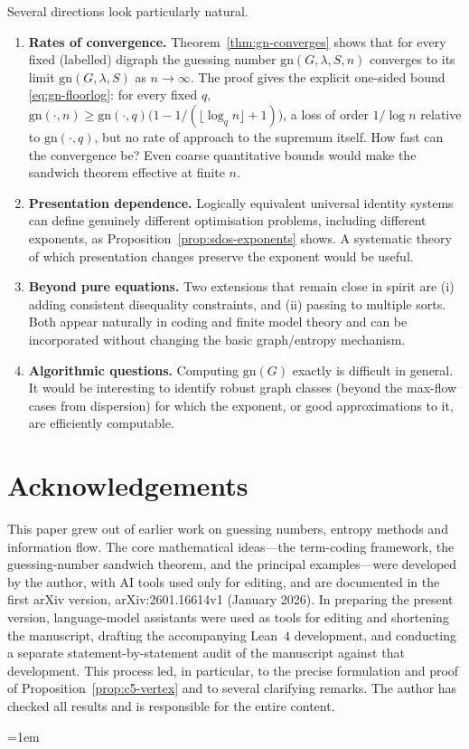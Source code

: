 \documentclass[11pt]{article}
\theoremstyle{plain}
\theoremstyle{definition}
\theoremstyle{definition}
\theoremstyle{remark}
\newcommand{\gn}{\mathrm{gn}}
\begin{document}
Several directions look particularly natural.
\begin{enumerate}[leftmargin=2.2em]
\item \textbf{Rates of convergence.}  Theorem~\ref{thm:gn-converges} shows that for every fixed (labelled) digraph the
  guessing number $\gn(G,\lambda,S,n)$ converges to its limit $\gn(G,\lambda,S)$ as $n\to\infty$.
  The proof gives the explicit one-sided bound \eqref{eq:gn-floorlog}: for every fixed $q$,
  $\gn(\cdot,n)\ge\gn(\cdot,q)\bigl(1-1/(\lfloor\log_q n\rfloor+1)\bigr)$, a loss of order
  $1/\log n$ relative to $\gn(\cdot,q)$, but no rate of approach to the supremum itself.  How
  fast can the convergence be?  Even coarse quantitative bounds would make the sandwich theorem effective at
  finite $n$.
\item \textbf{Presentation dependence.}  Logically equivalent universal identity systems can define genuinely
  different optimisation problems, including different exponents, as Proposition~\ref{prop:sdos-exponents} shows.
  A systematic theory of which presentation changes preserve the exponent would be useful.
\item \textbf{Beyond pure equations.}  Two extensions that remain close in spirit are (i) adding consistent
  disequality constraints, and (ii) passing to multiple sorts.  Both appear naturally in coding and finite
  model theory and can be incorporated without changing the basic graph/entropy mechanism.
\item \textbf{Algorithmic questions.}  Computing $\gn(G)$ exactly is difficult in general.  It would be
  interesting to identify robust graph classes (beyond the max-flow cases from dispersion) for which the
  exponent, or good approximations to it, are efficiently computable.
\end{enumerate}

\section*{Acknowledgements}
This paper grew out of earlier work on guessing numbers, entropy methods and information flow.
The core mathematical ideas---the term-coding framework, the guessing-number sandwich theorem,
and the principal examples---were developed by the author, with AI tools used only for editing,
and are documented in the first arXiv version, arXiv:2601.16614v1 (January 2026).
In preparing the present version, language-model assistants were used as tools for editing and
shortening the manuscript, drafting the accompanying Lean~4 development, and conducting
a separate statement-by-statement audit of the manuscript against that development.
This process led, in particular, to the precise formulation and proof of
Proposition~\ref{prop:c5-vertex} and to several clarifying remarks.
The author has checked all results and is responsible for the entire content.

\begingroup
\emergencystretch=1em
\printbibliography
\endgroup
\end{document}
